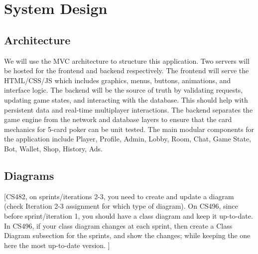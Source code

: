\documentclass{article}
\begin{document}
\section{System Design}

\subsection{Architecture}
We will use the MVC architecture to structure this application. Two servers will be hosted for the frontend and backend respectively. The frontend will serve the HTML/CSS/JS which includes graphics, menus, buttons, animations, and interface logic. The backend will be the source of truth by validating requests, updating game states, and interacting with the database. This should help with persistent data and real-time multiplayer interactions. The backend separates the game engine from the network and database layers to ensure that the card mechanics for 5-card poker can be unit tested. The main modular components for the application include Player, Profile, Admin, Lobby, Room, Chat, Game State, Bot, Wallet, Shop, History, Ads.

\subsection{Diagrams}
[CS482, on sprints/iterations 2-3, you need to create and update a diagram (check Iteration 2-3 assignment for which type of diagram). On CS496, since before sprint/iteration 1, you should have a class diagram and keep it up-to-date. In CS496, if your class diagram changes at each sprint, then create a Class Diagram subsection for the sprints, and show the changes; while keeping the one here the most up-to-date version. ]
\end{document}
